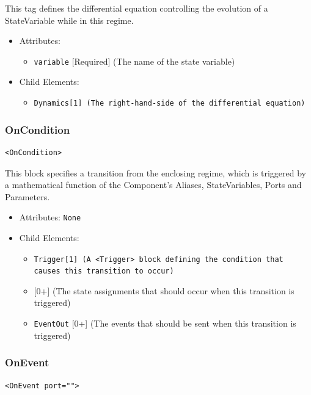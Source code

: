 \documentclass[draftspec]{ninemlspec}
\newcommand{\MathInline}{\tt{Dynamics}}
\newcommand{\StateAssignment}{\textbf{\class{StateAssignment}}\xspace}
\newcommand{\Trigger}{\tt{Trigger}}
\begin{document}
This tag defines the differential equation controlling the evolution of a
StateVariable while
in this regime.

\begin{itemize}
\item Attributes:
%
\begin{itemize}
\item \verb|variable| {[}Required{]} (The name of the state variable)
\end{itemize}

\item Child Elements:
%
\begin{itemize}
\item \MathInline {[}1{]} (The right-hand-side of the differential equation)
\end{itemize}
\end{itemize}

\subsubsection{OnCondition}
%
\begin{lstlisting}
<OnCondition>
\end{lstlisting}

This block specifies a transition from the enclosing regime, which is triggered
by a mathematical function of the Component's Aliases, StateVariables, Ports and
Parameters.

\begin{itemize}
\item Attributes: \texttt{None}

\item Child Elements:
%
\begin{itemize}
\item \Trigger {[}1{]} (A \verb|<Trigger>| block defining the condition that
causes this transition to occur)
\item \StateAssignment {[}0+{]} (The state assignments that should occur when
this transition is triggered)
\item {\tt EventOut} {[}0+{]} (The events that should be sent when this
transition is triggered)
\end{itemize}
\end{itemize}

\subsubsection{OnEvent}
%
\begin{lstlisting}
<OnEvent port="">
\end{lstlisting}
\end{document}
